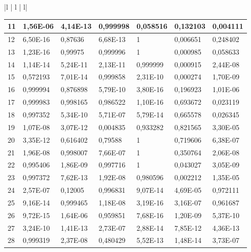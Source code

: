 \documentclass[a4paper,10pt]{article}
\begin{document}
{\begin{tabular}{ |l | l | l| }
\begin{centering}
\begin{centering}
{\begin{tabular}{ |l|l|l|l|l|l|l| }
11	        & 1,56E-06 & 4,14E-13 & 0,999998 & 0,058516 & 0,132103 & 0,004111 \\ \hline                      
12	        & 6,50E-16 & 0,87636  & 6,68E-13 & 1        & 0,006651 & 0,248402 \\ \hline              
13	        & 1,23E-16 & 0,99975  & 0,999996 & 1        & 0,000985 & 0,058633 \\ \hline               
14	        & 1,14E-14 & 5,24E-11 & 2,13E-11 & 0,999999 & 0,000915 & 2,44E-08 \\ \hline                        
15	        & 0,572193 & 7,01E-14 & 0,999858 & 2,31E-10 & 0,000274 & 1,70E-09 \\ \hline                       
16	        & 0,999994 & 0,876898 & 5,79E-10 & 3,80E-16 & 0,196923 & 1,01E-06 \\ \hline                    
17	        & 0,999983 & 0,998165 & 0,986522 & 1,10E-16 & 0,693672 & 0,023119 \\ \hline                    
18	        & 0,997352 & 5,34E-10 & 5,71E-07 & 5,79E-14 & 0,665578 & 0,026345 \\ \hline                      
19	        & 1,07E-08 & 3,07E-12 & 0,004835 & 0,933282 & 0,821565 & 3,30E-05 \\ \hline                      
20	        & 3,35E-12 & 0,616402 & 0,79588  & 1        & 0,719606 & 6,38E-07 \\ \hline           
21	        & 1,96E-08 & 0,998007 & 7,66E-07 & 1        & 0,350764 & 2,06E-08 \\ \hline             
22	        & 0,995406 & 1,86E-09 & 0,997716 & 1        & 0,043027 & 3,05E-09 \\ \hline             
23	        & 0,997372 & 7,62E-13 & 1,92E-08 & 0,980596 & 0,002212 & 1,35E-05 \\ \hline                      
24	        & 2,57E-07 & 0,12005  & 0,996831 & 9,07E-14 & 4,69E-05 & 0,972111 \\ \hline                    
25	        & 9,16E-14 & 0,999465 & 1,18E-08 & 3,19E-16 & 3,16E-07 & 0,961687 \\ \hline                      
26	        & 9,72E-15 & 1,64E-06 & 0,959851 & 7,68E-16 & 1,20E-09 & 5,37E-10 \\ \hline                      
27	        & 3,24E-10 & 1,41E-13 & 2,73E-07 & 2,88E-14 & 7,85E-12 & 4,36E-13 \\ \hline                       
28	        & 0,999319 & 2,37E-08 & 0,480429 & 5,52E-13 & 1,48E-14 & 3,73E-07 \\ \hline                     

\end{tabular}}
\end{centering}
\end{centering}
\end{tabular}}
\end{document}
